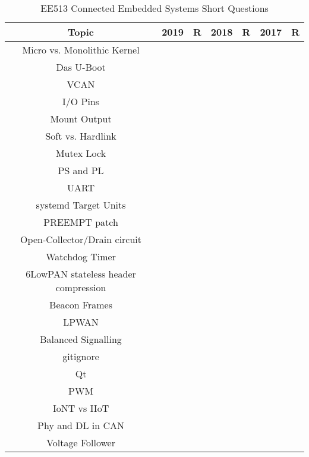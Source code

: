 \documentclass[a4paper]{article}
\begin{document}
\thispagestyle{empty}
	\begin{table}[h]
		\centering
		\caption{EE513 Connected Embedded Systems Short Questions}
		\begin{tabular}{|c||c|c||c|c||c|c||}
			\hline
			\hline
			Topic & 2019 & R & 2018 & R & 2017 & R \\
			\hline
			Micro vs. Monolithic Kernel & \checkmark & & &
			\checkmark & \checkmark & \\
			Das U-Boot & \checkmark & & & \checkmark & \checkmark & \\
			VCAN & \checkmark & & & & & \\
			I/O Pins & \checkmark & \checkmark & \checkmark & & & \\
			Mount Output & \checkmark & & & & & \\
			Soft vs. Hardlink & \checkmark & & & & \checkmark & \\
			Mutex Lock & \checkmark & & \checkmark & \checkmark &
			\checkmark & \\
			PS and PL & \checkmark & \checkmark & \checkmark & & &
			\checkmark \\
			UART & \checkmark & & & & & \\
			systemd Target Units & \checkmark & & & \checkmark &
			\checkmark & \\
			PREEMPT patch & \checkmark & \checkmark & \checkmark & &
			\checkmark & \checkmark \\
			Open-Collector/Drain circuit & \checkmark & & &
			\checkmark & \checkmark & \\
			Watchdog Timer & \checkmark & & & & & \\
			6LowPAN stateless header compression & & \checkmark & &
							     & & \\
			Beacon Frames & & \checkmark & & & & \\
			LPWAN & & \checkmark &\checkmark & & & \checkmark \\
			Balanced Signalling & & \checkmark & \checkmark & & &
			\checkmark \\
			gitignore & & \checkmark & & & & \\
			Qt & & \checkmark & & & & \\
			PWM & & \checkmark & & \checkmark & \checkmark & \\
			IoNT vs IIoT & & \checkmark & & & & \checkmark \\
			Phy and DL in CAN & & \checkmark & & & & \\
			Voltage Follower & & \checkmark & & & & \checkmark \\

\end{tabular}
\end{table}
\end{document}
